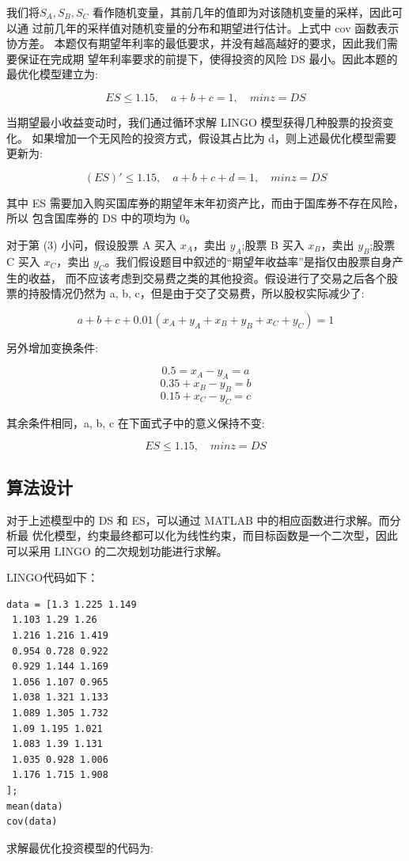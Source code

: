 \documentclass{article}
\begin{document}
我们将$S_A,S_B,S_C$ 看作随机变量，其前几年的值即为对该随机变量的采样，因此可以通 过前几年的采样值对随机变量的分布和期望进行估计。上式中 cov 函数表示协方差。
本题仅有期望年利率的最低要求，并没有越高越好的要求，因此我们需要保证在完成期 望年利率要求的前提下，使得投资的风险 DS 最小。因此本题的最优化模型建立为:

$$ES\leq 1.15,\quad a+b+c=1,\quad min z= DS$$

当期望最小收益变动时，我们通过循环求解 LINGO 模型获得几种股票的投资变化。 如果增加一个无风险的投资方式，假设其占比为 d，则上述最优化模型需要更新为:

$$(ES)'\leq1.15,\quad a+b+c+d=1,\quad minz=DS$$

其中 ES 需要加入购买国库券的期望年末年初资产比，而由于国库券不存在风险，所以 包含国库券的 DS 中的项均为 0。


对于第 (3) 小问，假设股票 A 买入 $x_A$，卖出 $y_A$;股票 B 买入 $x_B$，卖出 $y_B$;股票 C 买入 $x_C$，卖出 $y_C$。我们假设题目中叙述的“期望年收益率”是指仅由股票自身产生的收益， 而不应该考虑到交易费之类的其他投资。假设进行了交易之后各个股票的持股情况仍然为 a, b, c，但是由于交了交易费，所以股权实际减少了:

$$a+b+c+0.01(x_A+y_A+x_B+y_B+x_C+y_C)=1$$

另外增加变换条件:

$$0.5=x_A-y_A=a$$
$$0.35+x_B-y_B=b$$
$$0.15+x_C-y_C=c$$

其余条件相同，a, b, c 在下面式子中的意义保持不变:

$$ES\leq 1.15,\quad min z=DS$$


\subsection{算法设计}

对于上述模型中的 DS 和 ES，可以通过 MATLAB 中的相应函数进行求解。而分析最 优化模型，约束最终都可以化为线性约束，而目标函数是一个二次型，因此可以采用 LINGO 的二次规划功能进行求解。

LINGO代码如下：

\begin{lstlisting}
data = [1.3 1.225 1.149 
 1.103 1.29 1.26 
 1.216 1.216 1.419
 0.954 0.728 0.922 
 0.929 1.144 1.169 
 1.056 1.107 0.965 
 1.038 1.321 1.133 
 1.089 1.305 1.732 
 1.09 1.195 1.021 
 1.083 1.39 1.131 
 1.035 0.928 1.006 
 1.176 1.715 1.908
];
mean(data)
cov(data)
\end{lstlisting}

求解最优化投资模型的代码为:
\end{document}
